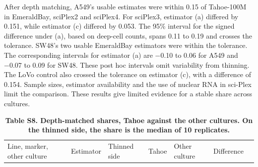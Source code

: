 \documentclass[
  11pt,
  letterpaper,
]{article}
\begin{document}
After depth matching, A549's usable estimates were within 0.15 of
Tahoe-100M in EmeraldBay, sciPlex2 and sciPlex4. For sciPlex3, estimator
(a) differed by 0.151, while estimator (c) differed by 0.053. The 95\%
interval for the signed difference under (a), based on deep-cell counts,
spans 0.11 to 0.19 and crosses the tolerance. SW48's two usable
EmeraldBay estimators were within the tolerance. The corresponding
intervals for estimator (a) are −0.10 to 0.06 for A549 and −0.07 to 0.09
for SW48. These post hoc intervals omit variability from thinning. The
LoVo control also crossed the tolerance on estimator (c), with a
difference of 0.154. Sample sizes, estimator availability and the use of
nuclear RNA in sci-Plex limit the comparison. These results give limited
evidence for a stable share across cultures.

\begin{longtable}[]{@{}
  >{\raggedright\arraybackslash}p{}
  >{\raggedright\arraybackslash}p{}
  >{\raggedright\arraybackslash}p{}
  >{\raggedright\arraybackslash}p{}
  >{\raggedright\arraybackslash}p{}
  >{\raggedright\arraybackslash}p{}
  >{\raggedright\arraybackslash}p{}@{}}
\caption{\textbf{Table S8. Depth-matched shares, Tahoe against the other
cultures. On the thinned side, the share is the median of 10
replicates.}}\tabularnewline
\toprule\noalign{}
\begin{minipage}[b]{\linewidth}\raggedright
Line, marker, other culture
\end{minipage} & \begin{minipage}[b]{\linewidth}\raggedright
Estimator
\end{minipage} & \begin{minipage}[b]{\linewidth}\raggedright
Thinned side
\end{minipage} & \begin{minipage}[b]{\linewidth}\raggedright
Tahoe
\end{minipage} & \begin{minipage}[b]{\linewidth}\raggedright
Other culture
\end{minipage} & \begin{minipage}[b]{\linewidth}\raggedright
Difference
\end{minipage} & \begin{minipage}[b]{\linewidth}\raggedright

\end{minipage}
\end{longtable}
\end{document}
